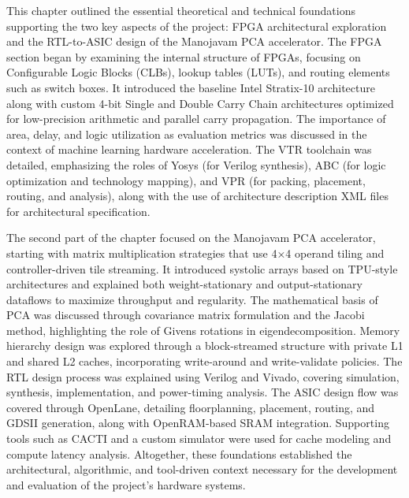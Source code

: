 This chapter outlined the essential theoretical and technical foundations supporting the two key aspects of the project: FPGA architectural exploration and the RTL-to-ASIC design of the Manojavam PCA accelerator. The FPGA section began by examining the internal structure of FPGAs, focusing on Configurable Logic Blocks (CLBs), lookup tables (LUTs), and routing elements such as switch boxes. It introduced the baseline Intel Stratix-10 architecture along with custom 4-bit Single and Double Carry Chain architectures optimized for low-precision arithmetic and parallel carry propagation. The importance of area, delay, and logic utilization as evaluation metrics was discussed in the context of machine learning hardware acceleration. The VTR toolchain was detailed, emphasizing the roles of Yosys (for Verilog synthesis), ABC (for logic optimization and technology mapping), and VPR (for packing, placement, routing, and analysis), along with the use of architecture description XML files for architectural specification.

The second part of the chapter focused on the Manojavam PCA accelerator, starting with matrix multiplication strategies that use 4×4 operand tiling and controller-driven tile streaming. It introduced systolic arrays based on TPU-style architectures and explained both weight-stationary and output-stationary dataflows to maximize throughput and regularity. The mathematical basis of PCA was discussed through covariance matrix formulation and the Jacobi method, highlighting the role of Givens rotations in eigendecomposition. Memory hierarchy design was explored through a block-streamed structure with private L1 and shared L2 caches, incorporating write-around and write-validate policies. The RTL design process was explained using Verilog and Vivado, covering simulation, synthesis, implementation, and power-timing analysis. The ASIC design flow was covered through OpenLane, detailing floorplanning, placement, routing, and GDSII generation, along with OpenRAM-based SRAM integration. Supporting tools such as CACTI and a custom simulator were used for cache modeling and compute latency analysis. Altogether, these foundations established the architectural, algorithmic, and tool-driven context necessary for the development and evaluation of the project's hardware systems.
